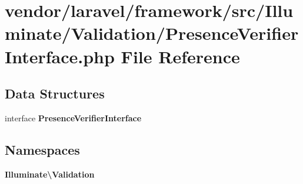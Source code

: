\section{vendor/laravel/framework/src/\+Illuminate/\+Validation/\+Presence\+Verifier\+Interface.php File Reference}
\label{_presence_verifier_interface_8php}
\subsection*{Data Structures}
\begin{DoxyCompactItemize}
\item 
interface {\bf Presence\+Verifier\+Interface}
\end{DoxyCompactItemize}
\subsection*{Namespaces}
\begin{DoxyCompactItemize}
\item 
 {\bf Illuminate\textbackslash{}\+Validation}
\end{DoxyCompactItemize}
